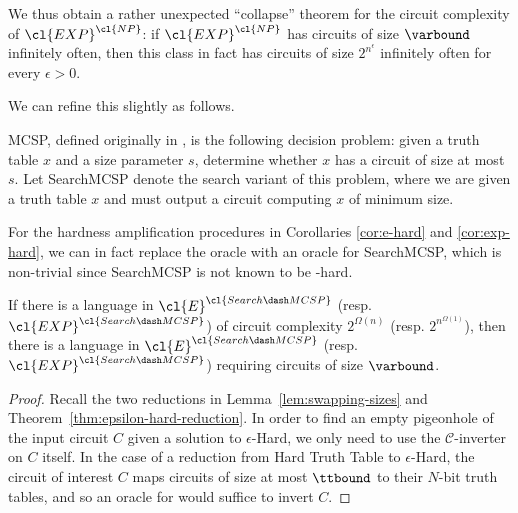 We thus obtain a rather unexpected ``collapse'' theorem for the circuit complexity of $\cl{EXP}^\cl{NP}$: if $\cl{EXP}^\cl{NP}$ has circuits of size $\varbound$ infinitely often, then this class in fact has circuits of size $2^{n^\epsilon}$ infinitely often for every $\epsilon > 0$.

We can refine this slightly as follows.
\begin{definition}
{\sc MCSP}, defined originally in \cite{circuit-minimization}, is the following decision problem: given a truth table $x$ and a size parameter $s$, determine whether $x$ has a circuit of size at most $s$. Let {\sc Search\dash MCSP} denote the search variant of this problem, where we are given a truth table $x$ and must output a circuit computing $x$ of minimum size.
\end{definition}
For the hardness amplification procedures in Corollaries \ref{cor:e-hard} and \ref{cor:exp-hard}, we can in fact replace the  oracle with an oracle for {\sc Search\dash MCSP}, which is non-trivial since {\sc Search\dash MCSP} is not known to be -hard.
\begin{corollary}\label{cor:smcsp-amp}
If there is a language in $\cl{E}^\cl{Search\dash MCSP}$ (resp. $\cl{EXP}^\cl{Search\dash MCSP}$)  of circuit complexity $2^{\Omega(n)}$ (resp. $2^{n^{\Omega(1)}}$), then there is a language in $\cl{E}^\cl{Search\dash MCSP}$ (resp.  $\cl{EXP}^\cl{Search\dash MCSP}$)  requiring circuits of size $\varbound$.
\end{corollary}
\begin{proof}
Recall the two reductions in Lemma~\ref{lem:swapping-sizes} and Theorem~\ref{thm:epsilon-hard-reduction}. In order to find an empty pigeonhole of the input circuit $C$ given a solution to {\sc $\epsilon$-Hard}, we only need to use the $\mathcal{C}$-inverter on $C$ itself. In the case of a reduction from {\sc Hard Truth Table} to {\sc $\epsilon$-Hard}, the circuit of interest $C$ maps circuits of size at most $\ttbound$ to their $N$-bit truth tables, and so an oracle for  would suffice to invert $C$.
\end{proof}
